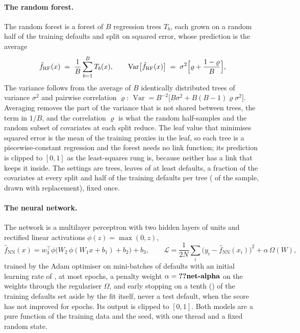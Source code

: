 \paragraph{The random forest.} The random forest \citep{lgd-ead:breiman2001} is a forest of $B$ regression trees $T_b$, each grown on a random half of the training defaults and split on squared error, whose prediction is the average
\begin{equation}
\hat f_{\mathrm{RF}}(x)\;=\;\frac1B\sum_{b=1}^{B}T_b(x),\qquad \operatorname{Var}\bigl[\hat f_{\mathrm{RF}}(x)\bigr]\;=\;\sigma^{2}\Bigl[\varrho+\frac{1-\varrho}{B}\Bigr],
\label{eq:lgd-ead-forest}
\end{equation}
The variance follows from the average of $B$ identically distributed trees of variance $\sigma^{2}$ and pairwise correlation $\varrho$: $\operatorname{Var}=B^{-2}\bigl[B\sigma^{2}+B(B-1)\varrho\sigma^{2}\bigr]$. Averaging removes the part of the variance that is not shared between trees, the term in $1/B$, and the correlation $\varrho$ is what the random half-samples and the random subset of covariates at each split reduce. The leaf value that minimises squared error is the mean of the training proxies in the leaf, so each tree is a piecewise-constant regression and the forest needs no link function; its prediction is clipped to $[0,1]$ as the least-squares rung is, because neither has a link that keeps it inside. The settings are  trees, leaves of at least  defaults, a fraction  of the covariates at every split and half of the training defaults per tree ( of the sample, drawn with replacement), fixed once.

\paragraph{The neural network.} The network is a multilayer perceptron with two hidden layers of  units and rectified linear activations $\phi(z)=\max(0,z)$,
\begin{equation}
\hat f_{\mathrm{NN}}(x)=w_3^{\top}\phi\bigl(W_2\,\phi(W_1x+b_1)+b_2\bigr)+b_3,\qquad \mathcal L=\frac1{2N}\sum_{i}\bigl(y_i-\hat f_{\mathrm{NN}}(x_i)\bigr)^{2}+\alpha\,\Omega(W),
\label{eq:lgd-ead-network}
\end{equation}
trained by the Adam optimiser \citep{lgd-ead:kingma2015} on mini-batches of  defaults with an initial learning rate of , at most  epochs, a penalty weight $\alpha=\LE{net-alpha}$ on the weights through the regulariser $\Omega$, and early stopping on a tenth () of the training defaults set aside by the fit itself, never a test default, when the score has not improved for  epochs. Its output is clipped to $[0,1]$. Both models are a pure function of the training data and the seed, with one thread and a fixed random state.


